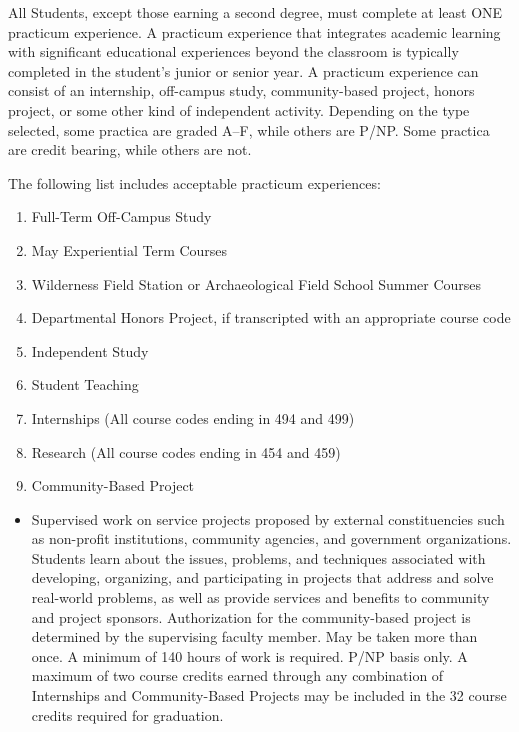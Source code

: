 \documentclass[
  letterpaper,
]{scrbook}
\providecommand{\tightlist}{%
  \setlength{\itemsep}{0pt}\setlength{\parskip}{0pt}}
\begin{document}
All Students, except those earning a second degree, must complete at
least ONE practicum experience. A practicum experience that integrates
academic learning with significant educational experiences beyond the
classroom is typically completed in the student's junior or senior year.
A practicum experience can consist of an internship, off-campus study,
community-based project, honors project, or some other kind of
independent activity. Depending on the type selected, some practica are
graded A--F, while others are P/NP. Some practica are credit bearing,
while others are not.

The following list includes acceptable practicum experiences:

\begin{enumerate}
\def\labelenumi{\arabic{enumi}.}
\tightlist
\item
  Full-Term Off-Campus Study
\item
  May Experiential Term Courses
\item
  Wilderness Field Station or Archaeological Field School Summer Courses
\item
  Departmental Honors Project, if transcripted with an appropriate
  course code
\item
  Independent Study
\item
  Student Teaching
\item
  Internships (All course codes ending in 494 and 499)
\item
  Research (All course codes ending in 454 and 459)
\item
  Community-Based Project
\end{enumerate}

\begin{itemize}
\tightlist
\item
  Supervised work on service projects proposed by external
  constituencies such as non-profit institutions, community agencies,
  and government organizations. Students learn about the issues,
  problems, and techniques associated with developing, organizing, and
  participating in projects that address and solve real-world problems,
  as well as provide services and benefits to community and project
  sponsors. Authorization for the community-based project is determined
  by the supervising faculty member. May be taken more than once. A
  minimum of 140 hours of work is required. P/NP basis only. A maximum
  of two course credits earned through any combination of Internships
  and Community-Based Projects may be included in the 32 course credits
  required for graduation.
\end{itemize}
\end{document}
